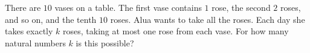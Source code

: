 There are $10$ vases on a table. The first vase contains $1$ rose, the second $2$ roses, and so on, and the tenth $10$ roses. Alua wants to take all the roses. Each day she takes exactly $k$ roses, taking at most one rose from each vase. For how many natural numbers $k$ is this possible?

